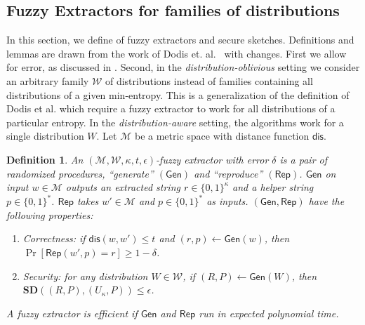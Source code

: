 \documentclass[11pt]{article}
\newcommand{\class}[1]{{\ensuremath{\mathsf{#1}}}}
\newcommand{\gen}{\ensuremath{\class{Gen}}\xspace}
\newcommand{\rep}{\ensuremath{\class{Rep}}\xspace}
\newcommand{\dis}{\ensuremath{\mathsf{dis}}}
\newtheorem{definition}[theorem]{Definition}
\begin{document}
\subsection{Fuzzy Extractors for families of distributions}\label{sec:fuzz extractor}

In this section, we define of fuzzy extractors and secure sketches.  Definitions and lemmas are drawn from the work of Dodis et. al.~\cite[Sections 2.5--4.1]{DBLP:journals/siamcomp/DodisORS08} with changes.  First we allow for error, as discussed in \cite[Sections 8]{DBLP:journals/siamcomp/DodisORS08}.  Second, in the \emph{distribution-oblivious} setting we consider an arbitrary family $\mathcal{W}$ of distributions instead of families containing all distributions of a given min-entropy.
This is a generalization of the definition of Dodis et al. which require a fuzzy extractor to work for all distributions of a particular entropy.  In the \emph{distribution-aware} setting, the algorithms work for a single distribution $W$.  Let $\mathcal{M}$ be a metric space with distance function $\dis$.

\begin{definition}
\label{def:fuzzy extractor}
An $(\mathcal{M}, \mathcal{W}, \kappa, t, \epsilon)$-\emph{fuzzy extractor} with error $\delta$ is a pair of randomized procedures, ``generate'' $(\gen)$ and ``reproduce'' $(\rep)$. \gen on input $w\in \mathcal{M}$ outputs an extracted string $r\in\{0,1\}^\kappa$ and a helper string $p\in\{0,1\}^*$. \rep takes $w'\in\mathcal{M}$ and $p\in\{0,1\}^*$ as inputs.   $(\gen, \rep)$ have the following properties:
\begin{enumerate}
\item \emph{Correctness:} if $\dis(w, w')\leq t$ and $(r, p)\leftarrow \gen(w)$, then $\Pr[\rep( w', p) = r] \geq 1-\delta$.
\item \emph{Security:} for any distribution $W\in\mathcal{W}$, if $(R,P)\leftarrow\gen (W)$, then $\mathbf{SD}((R,P),(U_\kappa,P))\leq \epsilon$.
\end{enumerate}
A fuzzy extractor is efficient if $\gen$ and $\rep$ run in expected polynomial time.
\end{definition}
\end{document}
